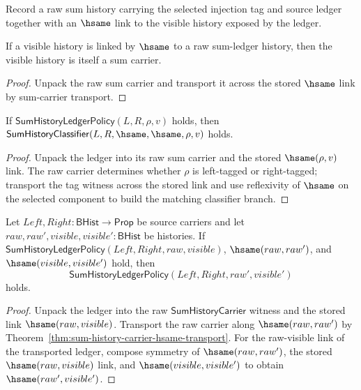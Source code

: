 \begin{definition}
\label{def:sum-ledger-policy}
Record a raw sum history carrying the selected injection tag and source ledger
together with an $\hsame$ link to the visible history exposed by the ledger.
\end{definition}

\begin{theorem}
\label{thm:sum-ledger-visible-carrier}
If a visible history is linked by $\hsame$ to a raw sum-ledger history, then
the visible history is itself a sum carrier.
\end{theorem}
\begin{proof}
Unpack the raw sum carrier and transport it across the stored $\hsame$ link
by sum-carrier transport.
\end{proof}

\begin{theorem}
\label{thm:sum-ledger-raw-visible-classifier}
If $\mathsf{SumHistoryLedgerPolicy}(L,R,\rho,v)$ holds, then
$\mathsf{SumHistoryClassifier}(L,R,\hsame,\hsame,\rho,v)$ holds.
\end{theorem}
\begin{proof}
Unpack the ledger into its raw sum carrier and the stored $\hsame(\rho,v)$
link. The raw carrier determines whether $\rho$ is left-tagged or right-tagged;
transport the tag witness across the stored link and use reflexivity of
$\hsame$ on the selected component to build the matching classifier branch.
\end{proof}

\begin{theorem}
\label{thm:sum-ledger-history-same-transport}
Let $Left,Right:\mathsf{BHist}\to\mathsf{Prop}$ be source carriers and let
$raw,raw',visible,visible':\mathsf{BHist}$ be histories. If
$\mathsf{SumHistoryLedgerPolicy}(Left,Right,raw,visible)$,
$\hsame(raw,raw')$, and $\hsame(visible,visible')$ hold, then
$$
  \mathsf{SumHistoryLedgerPolicy}(Left,Right,raw',visible')
$$
holds.
\end{theorem}
\begin{proof}
Unpack the ledger into the raw $\mathsf{SumHistoryCarrier}$ witness and the
stored link $\hsame(raw,visible)$. Transport the raw carrier along
$\hsame(raw,raw')$ by
Theorem~\ref{thm:sum-history-carrier-hsame-transport}. For the raw-visible
link of the transported ledger, compose symmetry of $\hsame(raw,raw')$, the
stored $\hsame(raw,visible)$ link, and $\hsame(visible,visible')$ to obtain
$\hsame(raw',visible')$.
\end{proof}

